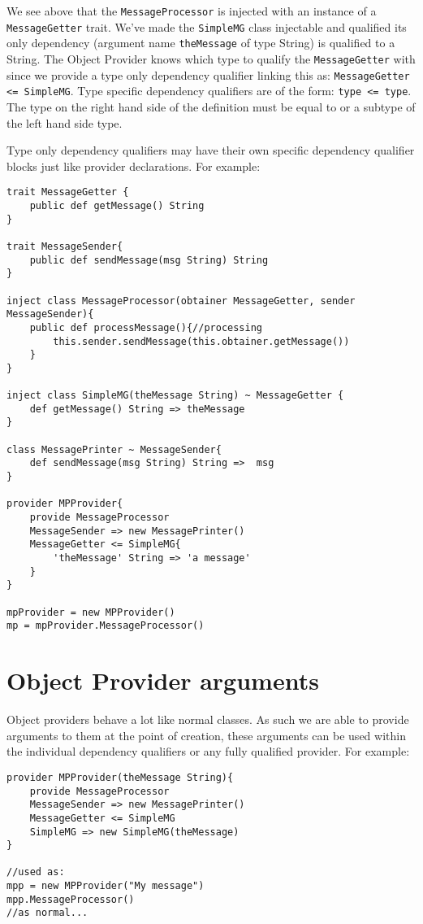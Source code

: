 \documentclass[conc-doc]{subfiles}
\begin{document}
We see above that the \lstinline{MessageProcessor} is injected with an instance of a \lstinline{MessageGetter} trait. We've made the \lstinline{SimpleMG} class injectable and qualified its only dependency (argument name \lstinline{theMessage} of type String) is qualified to a String. The Object Provider knows which type to qualify the \lstinline{MessageGetter} with since we provide a type only dependency qualifier linking this as: \lstinline{MessageGetter <= SimpleMG}. Type specific dependency qualifiers are of the form: \lstinline{type <= type}. The type on the right hand side of the definition must be equal to or a subtype of the left hand side type.

Type only dependency qualifiers may have their own specific dependency qualifier blocks just like provider declarations. For example:

\begin{lstlisting}
trait MessageGetter {
	public def getMessage() String
}

trait MessageSender{
	public def sendMessage(msg String) String
}

inject class MessageProcessor(obtainer MessageGetter, sender MessageSender){
	public def processMessage(){//processing
		this.sender.sendMessage(this.obtainer.getMessage())
	}
}

inject class SimpleMG(theMessage String) ~ MessageGetter {
	def getMessage() String => theMessage
}

class MessagePrinter ~ MessageSender{
	def sendMessage(msg String) String =>  msg
}

provider MPProvider{
	provide MessageProcessor
	MessageSender => new MessagePrinter()
	MessageGetter <= SimpleMG{
		'theMessage' String => 'a message'
	}
}

mpProvider = new MPProvider()
mp = mpProvider.MessageProcessor()
\end{lstlisting}

\section{Object Provider arguments}
Object providers behave a lot like normal classes. As such we are able to provide arguments to them at the point of creation, these arguments can be used within the individual dependency qualifiers or any fully qualified provider. For example:

\begin{lstlisting}
provider MPProvider(theMessage String){
	provide MessageProcessor
	MessageSender => new MessagePrinter()
	MessageGetter <= SimpleMG
	SimpleMG => new SimpleMG(theMessage)
}

//used as:
mpp = new MPProvider("My message")
mpp.MessageProcessor()
//as normal...
\end{lstlisting}
\end{document}

